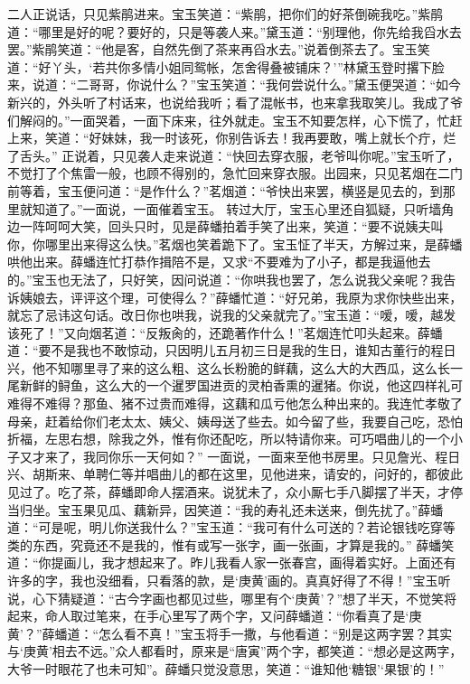 \documentclass[12pt,oneside]{book}
\begin{document}
二人正说话，只见紫鹃进来。宝玉笑道：“紫鹃，把你们的好茶倒碗我吃。”紫鹃道：“哪里是好的呢？要好的，只是等袭人来。”黛玉道：“别理他，你先给我舀水去罢。”紫鹃笑道：“他是客，自然先倒了茶来再舀水去。”说着倒茶去了。宝玉笑道：“好丫头，‘若共你多情小姐同鸳帐，怎舍得叠被铺床？’”林黛玉登时撂下脸来，说道：“二哥哥，你说什么？”宝玉笑道：“我何尝说什么。”黛玉便哭道：“如今新兴的，外头听了村话来，也说给我听；看了混帐书，也来拿我取笑儿。我成了爷们解闷的。”一面哭着，一面下床来，往外就走。宝玉不知要怎样，心下慌了，忙赶上来，笑道：“好妹妹，我一时该死，你别告诉去！我再要敢，嘴上就长个疔，烂了舌头。”
正说着，只见袭人走来说道：“快回去穿衣服，老爷叫你呢。”宝玉听了，不觉打了个焦雷一般，也顾不得别的，急忙回来穿衣服。出园来，只见茗烟在二门前等着，宝玉便问道：“是作什么？”茗烟道：“爷快出来罢，横竖是见去的，到那里就知道了。”一面说，一面催着宝玉。
转过大厅，宝玉心里还自狐疑，只听墙角边一阵呵呵大笑，回头只时，见是薛蟠拍着手笑了出来，笑道：“要不说姨夫叫你，你哪里出来得这么快。”茗烟也笑着跪下了。宝玉怔了半天，方解过来，是薛蟠哄他出来。薛蟠连忙打恭作揖陪不是，又求“不要难为了小子，都是我逼他去的。”宝玉也无法了，只好笑，因问说道：“你哄我也罢了，怎么说我父亲呢？我告诉姨娘去，评评这个理，可使得么？”薛蟠忙道：“好兄弟，我原为求你快些出来，就忘了忌讳这句话。改日你也哄我，说我的父亲就完了。”宝玉道：“嗳，嗳，越发该死了！”又向烟茗道：“反叛肏的，还跪著作什么！”茗烟连忙叩头起来。薛蟠道：“要不是我也不敢惊动，只因明儿五月初三日是我的生日，谁知古董行的程日兴，他不知哪里寻了来的这么粗、这么长粉脆的鲜藕，这么大的大西瓜，这么长一尾新鲜的鲟鱼，这么大的一个暹罗国进贡的灵柏香熏的暹猪。你说，他这四样礼可难得不难得？那鱼、猪不过贵而难得，这藕和瓜亏他怎么种出来的。我连忙孝敬了母亲，赶着给你们老太太、姨父、姨母送了些去。如今留了些，我要自己吃，恐怕折福，左思右想，除我之外，惟有你还配吃，所以特请你来。可巧唱曲儿的一个小子又才来了，我同你乐一天何如？”
一面说，一面来至他书房里。只见詹光、程日兴、胡斯来、单聘仁等并唱曲儿的都在这里，见他进来，请安的，问好的，都彼此见过了。吃了茶，薛蟠即命人摆酒来。说犹未了，众小厮七手八脚摆了半天，才停当归坐。宝玉果见瓜、藕新异，因笑道：“我的寿礼还未送来，倒先扰了。”薛蟠道：“可是呢，明儿你送我什么？”宝玉道：“我可有什么可送的？若论银钱吃穿等类的东西，究竟还不是我的，惟有或写一张字，画一张画，才算是我的。”
薛蟠笑道：“你提画儿，我才想起来了。昨儿我看人家一张春宫，画得着实好。上面还有许多的字，我也没细看，只看落的款，是‘庚黄’画的。真真好得了不得！”宝玉听说，心下猜疑道：“古今字画也都见过些，哪里有个‘庚黄’？”想了半天，不觉笑将起来，命人取过笔来，在手心里写了两个字，又问薛蟠道：“你看真了是‘庚黄’？”薛蟠道：“怎么看不真！”宝玉将手一撒，与他看道：“别是这两字罢？其实与‘庚黄’相去不远。”众人都看时，原来是“唐寅”两个字，都笑道：“想必是这两字，大爷一时眼花了也未可知”。薛蟠只觉没意思，笑道：“谁知他‘糖银’‘果银’的！”
\end{document}
